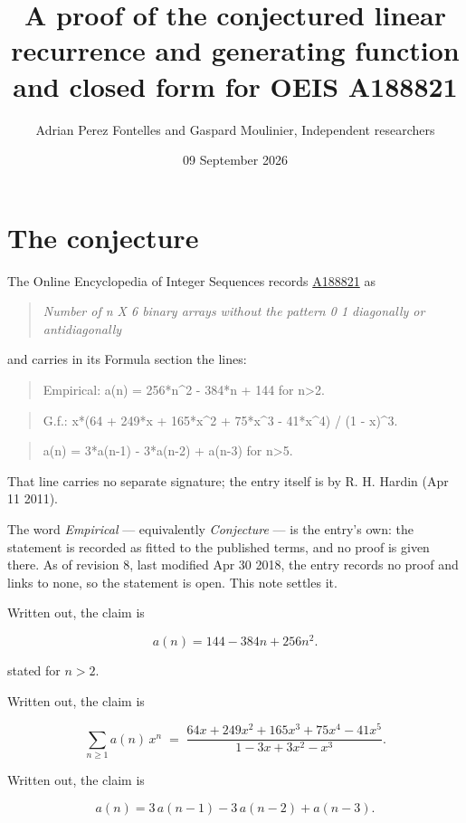 \documentclass[11pt]{article}
\title{A proof of the conjectured linear recurrence and generating function and closed form for OEIS A188821}
\author{Adrian Perez Fontelles and Gaspard Moulinier, Independent researchers}
\date{09 September 2026}
\theoremstyle{definition}
\begin{document}
\maketitle
\section{The conjecture}

The Online Encyclopedia of Integer Sequences records \href{https://oeis.org/A188821}{A188821} as

\begin{quote}\itshape Number of n X 6 binary arrays without the pattern 0 1 diagonally or antidiagonally\end{quote}

and carries in its Formula section the lines:

\begin{quote}\ttfamily Empirical: a(n) = 256*n\textasciicircum{}2 - 384*n + 144 for n>2.\end{quote}

\begin{quote}\ttfamily G.f.: x*(64 + 249*x + 165*x\textasciicircum{}2 + 75*x\textasciicircum{}3 - 41*x\textasciicircum{}4) / (1 - x)\textasciicircum{}3.\end{quote}

\begin{quote}\ttfamily a(n) = 3*a(n-1) - 3*a(n-2) + a(n-3) for n>5.\end{quote}

That line carries no separate signature; the entry itself is by R. H. Hardin (Apr 11 2011).

The word {\itshape Empirical} --- equivalently {\itshape Conjecture} --- is the entry's own: the statement is recorded as fitted to the published terms, and no proof is given there. As of revision 8, last modified Apr 30 2018, the entry records no proof and links to none, so the statement is open. This note settles it.

Written out, the claim is

\[a(n) = 144 - 384n + 256n^{2}.\]

stated for $n > 2$.

Written out, the claim is

\[\sum_{n \ge 1} a(n)\,x^n \;=\; \frac{64x + 249x^{2} + 165x^{3} + 75x^{4} - 41x^{5}}{1 - 3x + 3x^{2} - x^{3}}.\]

Written out, the claim is

\[a(n) = 3\,a(n-1) - 3\,a(n-2) + a(n-3).\]
\end{document}

